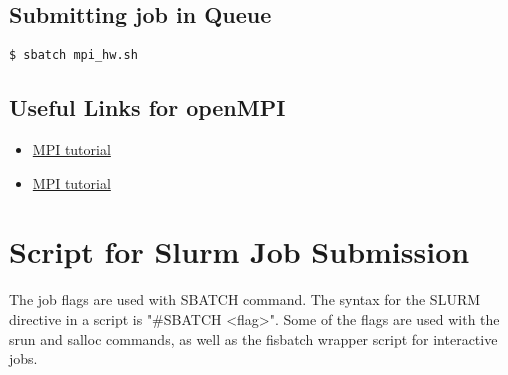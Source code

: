 \documentclass[11pt]{article}
\numberwithin{figure}{section}
\begin{document}
\subsection{Submitting job in Queue}

\begin{lstlisting}[frame=single]
$ sbatch mpi_hw.sh
\end{lstlisting}

\subsection{Useful Links for openMPI}

\begin{itemize}
    \item \href{https://www.google.com/url?sa=t&rct=j&q=&esrc=s&source=web&cd=1&cad=rja&uact=8&ved=0ahUKEwiC3oqOga_aAhXCvY8KHXJYCqwQFggnMAA&url=http%3A%2F%2Fmpitutorial.com%2Ftutorials%2F&usg=AOvVaw3gcXG-8XhYsVPu5egCZ2EP} {MPI tutorial}

\item \href{http://mpitutorial.com/tutorials/mpi-hello-world/}{MPI tutorial}
\end{itemize}

\section{Script for Slurm Job Submission}
The job flags are used with SBATCH command.  The syntax for the SLURM directive
in a script is  "\#SBATCH <flag>".  Some of the flags are used with the srun and
salloc commands, as well as the fisbatch wrapper script for interactive jobs.
\end{document}
